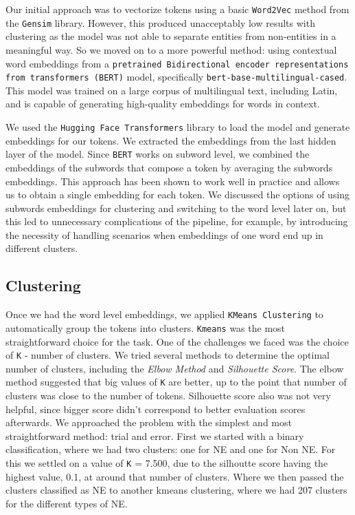 \documentclass[11pt]{article}
\begin{document}
Our initial approach was to vectorize tokens using a basic \texttt{Word2Vec} method from the \texttt{Gensim} library. However, this produced 
unacceptably low results with clustering as the model was not able to separate entities from non-entities in a meaningful way. So we moved on to
a more powerful method: using contextual word embeddings from a \texttt{pretrained Bidirectional encoder representations from transformers (BERT)} model,
specifically \texttt{bert-base-multilingual-cased}. This model was trained on a large corpus of multilingual text, including Latin, and is
capable of generating high-quality embeddings for words in context.

We used the \texttt{Hugging Face Transformers} library to load the model and generate embeddings for our tokens. We extracted the embeddings
from the last hidden layer of the model. Since \texttt{BERT} works on subword level, we combined the embeddings of the subwords that compose
a token by averaging the subwords embeddings. This approach has been shown to work well in practice and allows us to obtain a single embedding for
each token. We discussed the options of using subwords embeddings for clustering and switching to the word level later on, but this led to
unnecessary complications of the pipeline, for example, by introducing the necessity of handling scenarios when embeddings of one word end up
in different clusters.

\subsection{Clustering}

Once we had the word level embeddings, we applied \texttt{KMeans Clustering} to automatically group the tokens into clusters. \texttt{Kmeans}
was the most straightforward choice for the task. One of the challenges we faced was the choice of \texttt{K} - number of clusters. We tried
several methods to determine the optimal number of clusters, including the \textit{Elbow Method} and \textit{Silhouette Score}. 
The elbow method suggested that big values of \texttt{K} are better, up to the point that number of clusters was close to the number of tokens.
Silhouette score also was not very helpful, since bigger score didn't correspond to better evaluation scores afterwards. We approached the
problem with the simplest and most straightforward method: trial and error.
First we started with a binary classification, where we had two clusters: one for NE and one for Non NE. For this we settled on a value of
\texttt{K} = 7.500, due to the silhoutte score having the highest value, 0.1, at around that number of clusters. Where we then passed the clusters
classified as NE to another kmeans clustering, where we had 207 clusters for the different types of NE.
\end{document}
